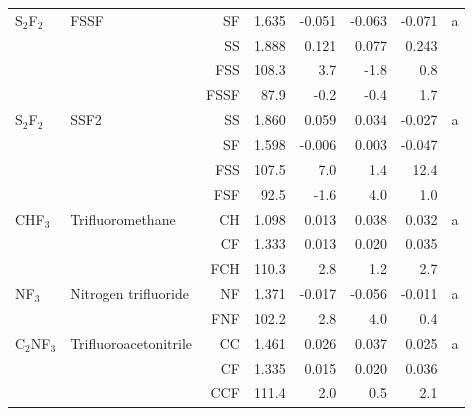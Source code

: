 \begin{table}
\begin{center}
\begin{tabular}{llrrrrrr}
 S$_2$F$_2$        & FSSF                               &SF            &     1.635   &    -0.051 &    -0.063 &    -0.071 &     a \\
             &                                    &SS            &     1.888   &     0.121 &     0.077 &     0.243 &       \\
             &                                    &FSS         &     108.3   &       3.7 &      -1.8 &       0.8   &       \\
             &                                    &FSSF        &      87.9   &      -0.2 &      -0.4 &       1.7   &       \\
 S$_2$F$_2$        & SSF2                               &SS            &     1.860   &     0.059 &     0.034 &    -0.027 &     a \\
             &                                    &SF            &     1.598   &    -0.006 &     0.003 &    -0.047 &       \\
             &                                    &FSS         &     107.5   &       7.0 &       1.4 &      12.4   &       \\
             &                                    &FSF         &      92.5   &      -1.6 &       4.0 &       1.0   &       \\
 CHF$_3$        & Trifluoromethane                   &CH            &     1.098   &     0.013 &     0.038 &     0.032 &     a \\
             &                                    &CF            &     1.333   &     0.013 &     0.020 &     0.035 &       \\
             &                                    &FCH         &     110.3   &       2.8 &       1.2 &       2.7   &       \\
 NF$_3$         & Nitrogen trifluoride               &NF            &     1.371   &    -0.017 &    -0.056 &    -0.011 &     a \\
             &                                    &FNF         &     102.2   &       2.8 &       4.0 &       0.4   &       \\
 C$_2$NF$_3$       & Trifluoroacetonitrile              &CC            &     1.461   &     0.026 &     0.037 &     0.025 &     a \\
             &                                    &CF            &     1.335   &     0.015 &     0.020 &     0.036 &       \\
             &                                    &CCF         &     111.4   &       2.0 &       0.5 &       2.1   &       \\

\end{tabular}
\end{center}
\end{table}
